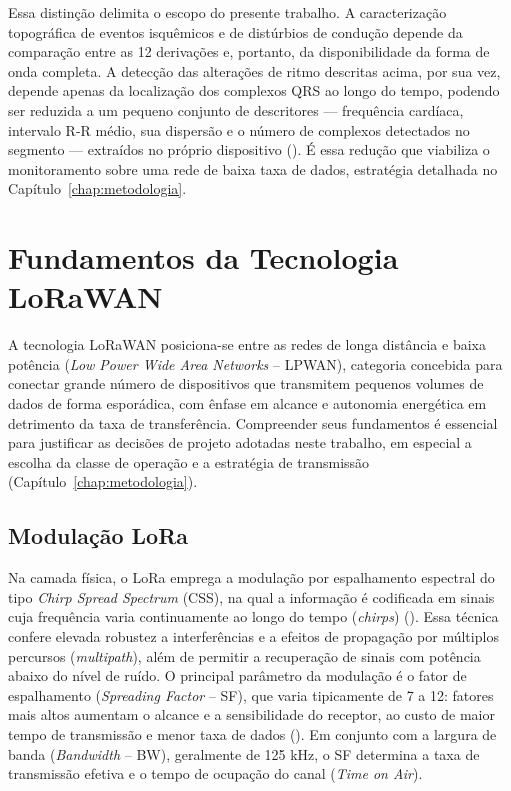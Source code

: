 Essa distinção delimita o escopo do presente trabalho. A caracterização topográfica de eventos isquêmicos e de distúrbios de condução depende da comparação entre as 12 derivações e, portanto, da disponibilidade da forma de onda completa. A detecção das alterações de ritmo descritas acima, por sua vez, depende apenas da localização dos complexos QRS ao longo do tempo, podendo ser reduzida a um pequeno conjunto de descritores --- frequência cardíaca, intervalo R-R médio, sua dispersão e o número de complexos detectados no segmento --- extraídos no próprio dispositivo (). É essa redução que viabiliza o monitoramento sobre uma rede de baixa taxa de dados, estratégia detalhada no Capítulo~\ref{chap:metodologia}.





\section{Fundamentos da Tecnologia LoRaWAN}
\label{sec:lorawan}

A tecnologia LoRaWAN posiciona-se entre as redes de longa distância e baixa potência (\textit{Low Power Wide Area Networks} -- LPWAN), categoria concebida para conectar grande número de dispositivos que transmitem pequenos volumes de dados de forma esporádica, com ênfase em alcance e autonomia energética em detrimento da taxa de transferência. Compreender seus fundamentos é essencial para justificar as decisões de projeto adotadas neste trabalho, em especial a escolha da classe de operação e a estratégia de transmissão (Capítulo~\ref{chap:metodologia}).

\subsection{Modulação LoRa}
\label{sec:moduloLora}

Na camada física, o LoRa emprega a modulação por espalhamento espectral do tipo \textit{Chirp Spread Spectrum} (\acs{CSS}), na qual a informação é codificada em sinais cuja frequência varia continuamente ao longo do tempo (\textit{chirps}) (). Essa técnica confere elevada robustez a interferências e a efeitos de propagação por múltiplos percursos (\textit{multipath}), além de permitir a recuperação de sinais com potência abaixo do nível de ruído. O principal parâmetro da modulação é o fator de espalhamento (\textit{Spreading Factor} -- SF), que varia tipicamente de 7 a 12: fatores mais altos aumentam o alcance e a sensibilidade do receptor, ao custo de maior tempo de transmissão e menor taxa de dados (). Em conjunto com a largura de banda (\textit{Bandwidth} -- BW), geralmente de 125 kHz, o SF determina a taxa de transmissão efetiva e o tempo de ocupação do canal (\textit{Time on Air}).

